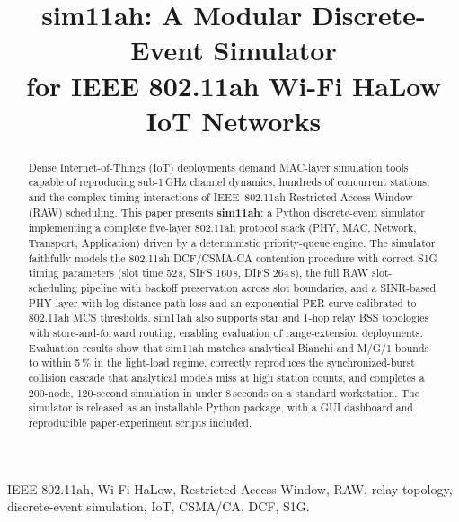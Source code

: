 \documentclass[conference]{IEEEtran}
\begin{document}
\title{sim11ah: A Modular Discrete-Event Simulator\\
for IEEE 802.11ah Wi-Fi HaLow IoT Networks}

\author{
}

\maketitle

\begin{abstract}
Dense Internet-of-Things (IoT) deployments demand MAC-layer simulation tools
capable of reproducing sub-1\,GHz channel dynamics, hundreds of concurrent
stations, and the complex timing interactions of IEEE~802.11ah Restricted
Access Window (RAW) scheduling.
This paper presents \textbf{sim11ah}: a Python discrete-event simulator
implementing a complete five-layer 802.11ah protocol stack (PHY, MAC, Network,
Transport, Application) driven by a deterministic priority-queue engine.
The simulator faithfully models the 802.11ah DCF/CSMA-CA contention procedure
with correct S1G timing parameters (slot time 52\,\textmu{}s, SIFS
160\,\textmu{}s, DIFS 264\,\textmu{}s), the full RAW slot-scheduling pipeline
with backoff preservation across slot boundaries, and a SINR-based PHY layer
with log-distance path loss and an exponential PER curve calibrated to
802.11ah MCS thresholds.
sim11ah also supports star and 1-hop relay BSS topologies with
store-and-forward routing, enabling evaluation of range-extension deployments.
Evaluation results show that sim11ah matches analytical Bianchi and M/G/1
bounds to within 5\,\% in the light-load regime, correctly reproduces the
synchronized-burst collision cascade that analytical models miss at high
station counts, and completes a 200-node, 120-second simulation in under
8\,seconds on a standard workstation.
The simulator is released as an installable Python package, with a GUI
dashboard and reproducible paper-experiment scripts included.
\end{abstract}

\begin{IEEEkeywords}
IEEE 802.11ah, Wi-Fi HaLow, Restricted Access Window, RAW, relay topology,
discrete-event simulation, IoT, CSMA/CA, DCF, S1G.
\end{IEEEkeywords}
\end{document}
